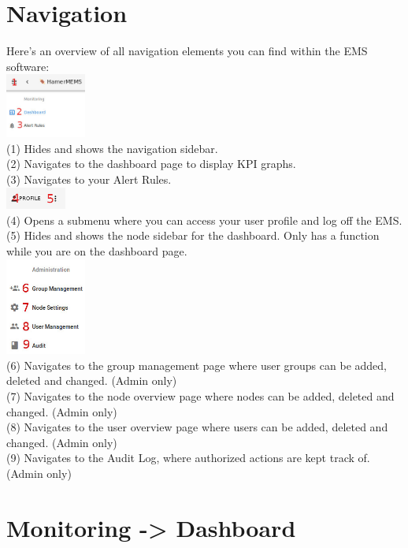 \documentclass[twoside,a4paper]{refart}
\begin{document}
    \section{Navigation}
    \label{navi}
    Here's an overview of all navigation elements you can find within the EMS software: \\
    \includegraphics[width=100px]{navigation1.jpeg} \\
    (1) Hides and shows the navigation sidebar. \\
    (2) Navigates to the dashboard page to display KPI graphs. \\
    (3) Navigates to your Alert Rules. \\
    \includegraphics[width=75px]{navigation2.jpeg} \\
    (4) Opens a submenu where you can access your user profile and log off the EMS. \\
    (5) Hides and shows the node sidebar for the dashboard. Only has a function while you are on the dashboard page. \\
    \includegraphics[width=100px]{navigation3.jpeg} \\
    (6) Navigates to the group management page where user groups can be added, deleted and changed. (Admin only) \\
    (7) Navigates to the node overview page where nodes can be added, deleted and changed. (Admin only) \\
    (8) Navigates to the user overview page where users can be added, deleted and changed. (Admin only) \\
    (9) Navigates to the Audit Log, where authorized actions are kept track of. (Admin only)
    \section{Monitoring -> Dashboard}
\end{document}
